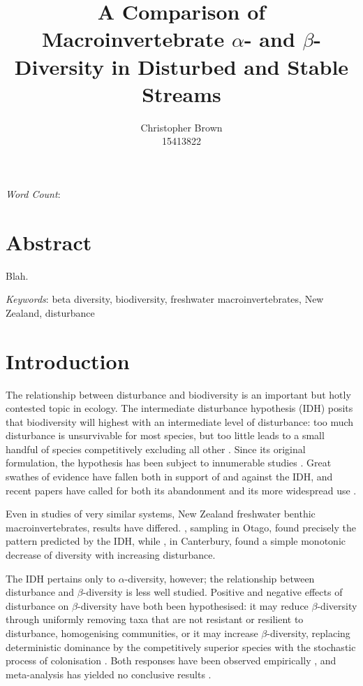 \documentclass[a4paper,10pt]{article}
\title{A Comparison of Macroinvertebrate $\alpha$- and $\beta$-Diversity in Disturbed and Stable Streams}
\author{
	Christopher Brown\\15413822
}
\date{}
\begin{document}
\maketitle

\begin{center}
	\emph{Word Count}: %
\end{center}

\section*{Abstract}

Blah.

\bigskip\noindent\emph{Keywords}:
beta diversity,
biodiversity,
freshwater macroinvertebrates,
New Zealand,
disturbance

\clearpage


\section*{Introduction}

The relationship between disturbance and biodiversity is an important but hotly contested topic in ecology.
The intermediate disturbance hypothesis (IDH) posits that biodiversity will highest with an intermediate level of disturbance: too much disturbance is unsurvivable for most species, but too little leads to a small handful of species competitively excluding all other \parencite{idh-original}.
Since its original formulation, the hypothesis has been subject to innumerable studies \parencite{disturbance-diversity-predict-test}.
Great swathes of evidence have fallen both in support of and against the IDH, and recent papers have called for both its abandonment \parencite{idh-abandon} and its more widespread use \parencite{idh-patch-dynamics}.

Even in studies of very similar systems, New Zealand freshwater benthic macroinvertebrates, results have differed.
\textcite{idh-refugia-streams}, sampling in Otago, found precisely the pattern predicted by the IDH, while \textcite{diversity-stability-canterbury}, in Canterbury, found a simple monotonic decrease of diversity with increasing disturbance.

The IDH pertains only to $\alpha$-diversity, however; the relationship between disturbance and $\beta$-diversity is less well studied.
Positive and negative effects of disturbance on $\beta$-diversity have both been hypothesised:
it may reduce $\beta$-diversity through uniformly removing taxa that are not resistant or resilient to disturbance, homogenising communities,
or it may increase $\beta$-diversity, replacing deterministic dominance by the competitively superior species with the stochastic process of colonisation \parencite{disturbance-beta-meta}.
Both responses have been observed empirically \parencite{disturbance-increase-beta, homogenisation-agriculture}, and meta-analysis has yielded no conclusive results \parencite{disturbance-beta-meta}.
\end{document}

